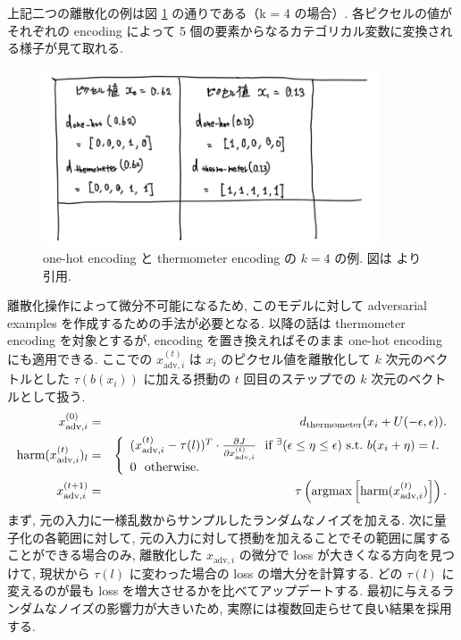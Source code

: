上記二つの離散化の例は図 \ref{fig:termometer-encoding-encodings} の通りである（k = 4 の場合）.
各ピクセルの値がそれぞれの encoding によって 5 個の要素からなるカテゴリカル変数に変換される様子が見て取れる.
%
\begin{figure}[htbp]
\begin{center}
\includegraphics[width=10.0cm]{figures/termometer-encoding-encodings.pdf}
\end{center}
\caption{
one-hot encoding と thermometer encoding の $k=4$ の例.
図は \cite{buckman2018thermometer} より引用.
}
\label{fig:termometer-encoding-encodings}
\end{figure}

離散化操作によって微分不可能になるため, このモデルに対して adversarial examples を作成するための手法が必要となる.
以降の話は thermometer encoding を対象とするが, encoding を置き換えればそのまま one-hot encoding にも適用できる.
ここでの $x^{(t)}_{\text{adv},i}$ は $x_i$ のピクセル値を離散化して $k$ 次元のベクトルとした $\tau(b(x_i))$ に加える摂動の $t$ 回目のステップでの $k$ 次元のベクトルとして扱う.
%
\begin{eqnarray}
x^{(0)}_{\text{adv},i} &=& d_{\text{thermometer}} (x_i + U(-\epsilon, \epsilon)).\\
\text{harm} (x^{(t)}_{\text{adv},i})_l &=& \left\{ \begin{array}{l}
(x^{(t)}_{\text{adv},i} - \tau (l))^T \cdot \frac{\partial J}{\partial x^{(t)}_{\text{adv},i}} \ \ \text{if} \ ^{\exists}(\epsilon \leq \eta \leq \epsilon) \ \text{s.t.} \ b(x_i + \eta) = l. \\
0 \ \ \text{otherwise.} \\
\end{array} \right.\\
x^{(t+1)}_{\text{adv},i} &=& \tau \left(\mathop{\rm argmax}\limits \left[ \text{harm} (x^{(t)}_{\text{adv},i}) \right]\right).
\label{eq:thermometer-encoding-dga}
\end{eqnarray}
%
まず, 元の入力に一様乱数からサンプルしたランダムなノイズを加える.
次に量子化の各範囲に対して, 元の入力に対して摂動を加えることでその範囲に属することができる場合のみ, 離散化した $x_{\text{adv},i}$ の微分で loss が大きくなる方向を見つけて, 現状から $\tau(l)$ に変わった場合の loss の増大分を計算する.
どの $\tau(l)$ に変えるのが最も loss を増大させるかを比べてアップデートする.
最初に与えるランダムなノイズの影響力が大きいため, 実際には複数回走らせて良い結果を採用する.

